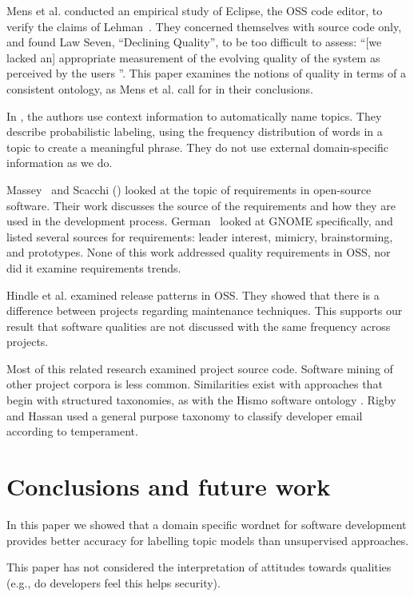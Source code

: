 \documentclass[10pt, conference, compsocconf]{IEEEtran}
\begin{document}
Mens et al. \cite{mens08icsm} conducted an empirical study of Eclipse, the OSS code editor, to verify the claims of Lehman~\cite{lehman97sms}. They concerned themselves with source code only, and found Law Seven, ``Declining Quality'', to be too difficult to assess: ``[we lacked an] appropriate measurement of the evolving quality of the system as perceived by the users \cite[p. 388]{mens08icsm}''. This paper examines the notions of quality in terms of a consistent ontology, as Mens et al. call for in their conclusions.

In \cite{Mei2007}, the authors use context information to automatically name topics. They describe probabilistic labeling, using the frequency distribution of words in a topic to create a meaningful phrase. They do not use external domain-specific information as we do.

Massey~\cite{massey02icse} and Scacchi (\cite{scacchi02,scacchi05b}) looked at the topic of requirements in open-source software. Their work discusses the source of the requirements and how they are used in the development process. German~\cite{german03gnome} looked at GNOME specifically, and listed several sources for requirements: leader interest, mimicry, brainstorming, and prototypes. None of this work  addressed quality requirements in OSS, nor did it examine requirements trends.

Hindle et al. \cite{Hindle2007} examined release patterns in OSS. They showed that there is a difference between projects regarding maintenance techniques. This supports our result that software qualities are not discussed with the same frequency across projects.

Most of this related research examined project source code. Software mining of other project corpora is less common. Similarities exist with approaches that begin with structured taxonomies, as with the Hismo software ontology \cite{girba06}. Rigby and Hassan \cite{rigby07msr} used a general purpose taxonomy to classify developer email according to temperament.

\section{Conclusions and future work}
In this paper we showed that a domain specific wordnet for software development provides better accuracy for labelling topic models than unsupervised approaches.

This paper has not considered the interpretation of attitudes towards qualities (e.g., do developers feel this helps security).




\end{document}
